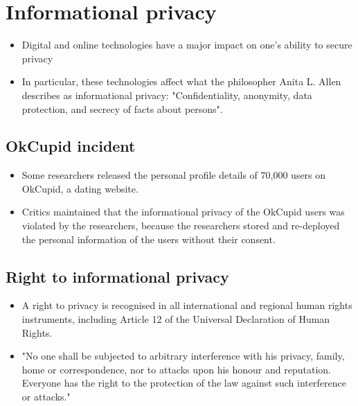 \documentclass[11pt]{article}
\begin{document}
\section{Informational privacy}
\label{sec:orgbb2ebf7}
\begin{itemize}
\item Digital and online technologies have a major impact on one's ability to secure privacy
\item In particular, these technologies affect what the philosopher Anita L. Allen describes as informational privacy: "Confidentiality, anonymity, data protection, and secrecy of facts about persons".
\end{itemize}

\subsection{OkCupid incident}
\label{sec:org6f6217f}
\begin{itemize}
\item Some researchers released the personal profile details of 70,000 users on OkCupid, a dating website.
\item Critics maintained that the informational privacy of the OkCupid users was violated by the researchers, because the researchers stored and re-deployed the personal information of the users without their consent.
\end{itemize}

\subsection{Right to informational privacy}
\label{sec:org768d169}
\begin{itemize}
\item A right to privacy is recognised in all international and regional human rights instruments, including Article 12 of the Universal Declaration of Human Rights.
\item "No one shall be subjected to arbitrary interference with his privacy, family, home or correspondence, nor to attacks upon his honour and reputation. Everyone has the right to the protection of the law against such interference or attacks."
\end{itemize}
\end{document}
